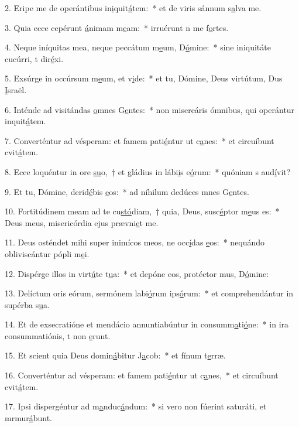 2. Eripe me de operántibus in\uline{i}quit\uline{á}tem:~* et de viris sánnum s\uline{a}lva me.\par 
3. Quia ecce cepérunt \uline{á}nimam m\uline{e}am:~* irruérunt n me f\uline{o}rtes.\par 
4. Neque iníquitas mea, neque peccátum m\uline{e}um, D\uline{ó}mine:~* sine iniquitáte cucúrri, t dir\uline{é}xi.\par 
5. Exsúrge in occúrsum m\uline{e}um, et v\uline{i}de:~* et tu, Dómine, Deus virtútum, Dus \uline{I}sraël.\par 
6. Inténde ad visitándas \uline{o}mnes G\uline{e}ntes:~* non misereáris ómnibus, qui operántur inquit\uline{á}tem.\par 
7. Converténtur ad vésperam: et famem pati\uline{é}ntur ut c\uline{a}nes:~* et circuíbunt cvit\uline{á}tem.\par 
8. Ecce loquéntur in ore \uline{su}o,~† et gládius in lábi\uline{i}s e\uline{ó}rum:~* quóniam s aud\uline{í}vit?\par 
9. Et tu, Dómine, derid\uline{é}bis \uline{e}os:~* ad níhilum dedúces mnes G\uline{e}ntes.\par 
10. Fortitúdinem meam ad te cu\uline{stó}diam,~† quia, Deus, susc\uline{é}ptor m\uline{e}us es:~* Deus meus, misericórdia ejus prævni\uline{e}t me.\par 
11. Deus osténdet mihi super inimícos meos, ne occ\uline{í}das \uline{e}os:~* nequándo obliviscántur pópli m\uline{e}i.\par 
12. Dispérge illos in virt\uline{ú}te t\uline{u}a:~* et depóne eos, protéctor mus, D\uline{ó}mine:\par 
13. Delíctum oris eórum, sermónem labi\uline{ó}rum ips\uline{ó}rum:~* et comprehendántur in supérba s\uline{u}a.\par 
14. Et de exsecratióne et mendácio annuntiabúntur in consumm\uline{a}ti\uline{ó}ne:~* in ira consummatiónis, t non \uline{e}runt.\par 
15. Et scient quia Deus domin\uline{á}bitur J\uline{a}cob:~* et fínum t\uline{e}rræ.\par 
16. Converténtur ad vésperam: et famem pati\uline{é}ntur ut c\uline{a}nes,~* et circuíbunt cvit\uline{á}tem.\par 
17. Ipsi dispergéntur ad m\uline{a}nduc\uline{á}ndum:~* si vero non fúerint saturáti, et mrmur\uline{á}bunt.\par 
